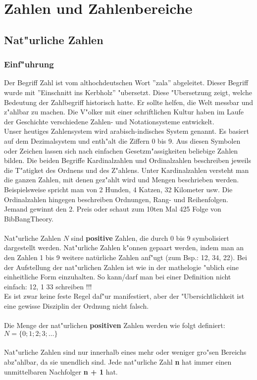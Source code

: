 \chapter{Zahlen und Zahlenbereiche}
\section{Nat"urliche Zahlen}
\subsection{Einf"uhrung}
Der Begriff Zahl ist vom althochdeutschen Wort ''zala'' abgeleitet.
Dieser Begriff wurde mit ''Einschnitt ins Kerbholz'' "ubersetzt.
Diese "Ubersetzung zeigt, welche Bedeutung der Zahlbegriff historisch hatte.
Er sollte helfen, die Welt messbar und z"ahlbar zu machen. Die V"olker mit einer
schriftlichen Kultur haben im Laufe der Geschichte verschiedene Zahlen- und Notationsysteme
entwickelt. \\
Unser heutiges Zahlensystem wird arabisch-indisches System genannt. Es basiert auf
dem Dezimalsystem und enth"alt die Ziffern 0 bis 9. Aus diesen Symbolen oder Zeichen lassen
sich nach einfachen Gesetzm"assigkeiten beliebige Zahlen bilden.
Die beiden Begriffe Kardinalzahlen und Ordinalzahlen beschreiben jeweils die T"atigket des
Ordnens und des Z"ahlens.
Unter Kardinalzahlen versteht man die ganzen Zahlen, mit denen gez"ahlt wird und Mengen
beschrieben werden. Beispielsweise spricht man von 2 Hunden, 4 Katzen, 32 Kilometer usw.
Die Ordinalzahlen hingegen beschreiben Ordnungen, Rang- und Reihenfolgen.
Jemand gewinnt den 2. Preis oder schaut zum 10ten Mal 425 Folge von BibBangTheory.\\
\\
Nat"urliche Zahlen $N$ sind \textbf{positive} Zahlen, die durch 0
bis 9 symbolisiert dargestellt werden.
Nat"urliche Zahlen k"onnen gepaart werden, indem man an den Zahlen 1 bis 9
weitere natürliche Zahlen anf"ugt (zum Bsp.: 12, 34, 22).
Bei der Aufstellung der nat"urlichen Zahlen ist wie in der mathelogie
"ublich eine einheitliche Form einzuhalten.
So kann/darf man bei einer Definition nicht einfach: 12, 1 33
schreiben !!! \\
Es ist zwar keine feste Regel daf"ur manifestiert, aber der "Ubersichtlichkeit
ist eine gewisse Disziplin der Ordnung nicht falsch. \\
\\
Die Menge der nat"urlichen \textbf{positiven} Zahlen werden wie folgt
definiert: \\
$N = \{ 0;1;2;3; \ldots \}$ \\
\\
Nat"urliche Zahlen sind nur innerhalb eines mehr oder weniger
gro"sen Bereichs abz"ahlbar, da sie unendlich sind. Jede nat"urliche Zahl
\textbf{n} hat immer einen unmittelbaren Nachfolger \textbf{n + 1} hat.

